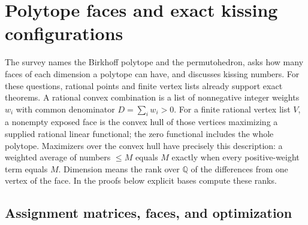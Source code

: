 \section{Polytope faces and exact kissing configurations}
\label{sec:polygeom}

The survey names the Birkhoff polytope and the permutohedron, asks how
many faces of each dimension a polytope can have, and discusses kissing
numbers. For these questions, rational points and finite vertex lists
already support exact theorems. A rational convex combination is a list
of nonnegative integer weights \(w_i\) with common denominator
\(D=\sum_i w_i>0\). For a finite rational vertex list \(V\), a
nonempty exposed face is the convex hull of those vertices maximizing
a supplied rational linear functional; the zero functional includes
the whole polytope. Maximizers over the convex hull have precisely this
description: a weighted average of numbers \(\le M\) equals \(M\)
exactly when every positive-weight term equals \(M\).
Dimension means the rank over \(\mathbb Q\) of the differences from one
vertex of the face. In the proofs below explicit bases compute these ranks.

\subsection{Assignment matrices, faces, and optimization}

